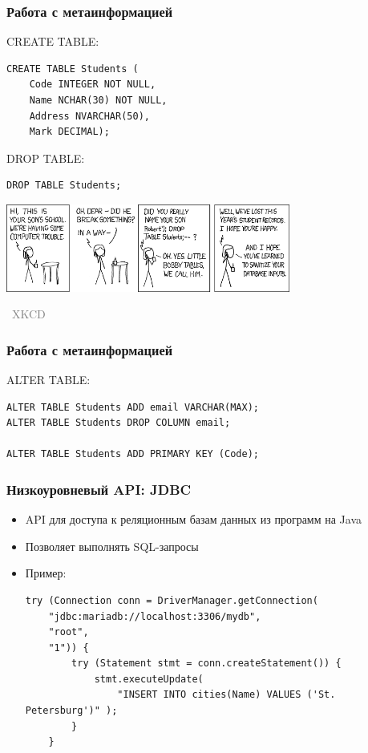 \documentclass[xetex,mathserif,serif]{beamer}
\newcommand{\attribution}[1] {
\vspace{-5mm}\begin{flushright}\begin{scriptsize}\textcolor{gray}{\textcopyright\, #1}\end{scriptsize}\end{flushright}
}
\begin{document}
	\begin{frame}[fragile]
		\frametitle{Работа с метаинформацией}
		\begin{small}
			CREATE TABLE:
			\begin{verbatim}
CREATE TABLE Students (
    Code INTEGER NOT NULL,
    Name NCHAR(30) NOT NULL,
    Address NVARCHAR(50),
    Mark DECIMAL);
			\end{verbatim}

			\vspace{3mm}
			DROP TABLE:
			\begin{verbatim}
DROP TABLE Students;
			\end{verbatim}
		\end{small}

		\begin{center}
			\includegraphics[width=0.7\textwidth]{bobbyTables.png}
			\attribution{XKCD}
		\end{center}
	\end{frame}

	\begin{frame}[fragile]
		\frametitle{Работа с метаинформацией}
		ALTER TABLE:
		\begin{verbatim}
ALTER TABLE Students ADD email VARCHAR(MAX);
ALTER TABLE Students DROP COLUMN email;

ALTER TABLE Students ADD PRIMARY KEY (Code);

		\end{verbatim}
	\end{frame}

	\begin{frame}[fragile]
		\frametitle{Низкоуровневый API: JDBC}
		\begin{itemize}
			\item API для доступа к реляционным базам данных из программ на Java
			\item Позволяет выполнять SQL-запросы
			\item Пример:
			\begin{footnotesize}
				\begin{verbatim}
try (Connection conn = DriverManager.getConnection(
    "jdbc:mariadb://localhost:3306/mydb",
    "root",
    "1")) {
        try (Statement stmt = conn.createStatement()) {
            stmt.executeUpdate(
                "INSERT INTO cities(Name) VALUES ('St. Petersburg')" );
        }
    }
				\end{verbatim}
			\end{footnotesize}
		\end{itemize}
	\end{frame}
\end{document}
